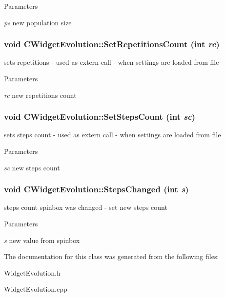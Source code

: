 \begin{DoxyParams}{Parameters}
\item[{\em ps}]new population size \end{DoxyParams}
\hypertarget{classCWidgetEvolution_a3e5d42568af5ae95dd8d6c23ffa3d8a6}{
\subsubsection[{SetRepetitionsCount}]{\setlength{\rightskip}{0pt plus 5cm}void CWidgetEvolution::SetRepetitionsCount (int {\em rc})}}
\label{classCWidgetEvolution_a3e5d42568af5ae95dd8d6c23ffa3d8a6}
sets repetitions -\/ used as extern call -\/ when settings are loaded from file


\begin{DoxyParams}{Parameters}
\item[{\em rc}]new repetitions count \end{DoxyParams}
\hypertarget{classCWidgetEvolution_a86ca9aaaa80695bb4c70347d971a76d5}{
\subsubsection[{SetStepsCount}]{\setlength{\rightskip}{0pt plus 5cm}void CWidgetEvolution::SetStepsCount (int {\em sc})}}
\label{classCWidgetEvolution_a86ca9aaaa80695bb4c70347d971a76d5}
sets steps count -\/ used as extern call -\/ when settings are loaded from file


\begin{DoxyParams}{Parameters}
\item[{\em sc}]new steps count \end{DoxyParams}
\hypertarget{classCWidgetEvolution_adcbaead4616e9947c5b0697677af0c20}{
\subsubsection[{StepsChanged}]{\setlength{\rightskip}{0pt plus 5cm}void CWidgetEvolution::StepsChanged (int {\em s})}}
\label{classCWidgetEvolution_adcbaead4616e9947c5b0697677af0c20}
steps count spinbox was changed -\/ set new steps count


\begin{DoxyParams}{Parameters}
\item[{\em s}]new value from spinbox \end{DoxyParams}


The documentation for this class was generated from the following files:\begin{DoxyCompactItemize}
\item 
WidgetEvolution.h\item 
WidgetEvolution.cpp\end{DoxyCompactItemize}
